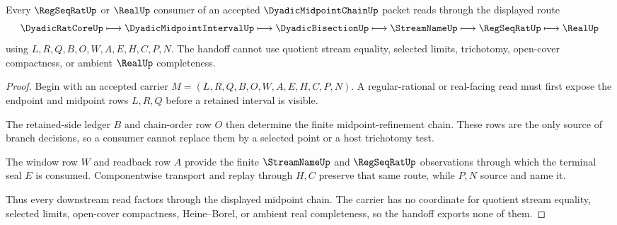 \begin{theorem}
\label{thm:dyadic-midpoint-chain-regseqrat-handoff}
Every $\RegSeqRatUp$ or $\RealUp$ consumer of an accepted $\DyadicMidpointChainUp$ packet reads through the displayed route
$$
\DyadicRatCoreUp \longmapsto \DyadicMidpointIntervalUp \longmapsto \DyadicBisectionUp \longmapsto \StreamNameUp \longmapsto \RegSeqRatUp \longmapsto \RealUp
$$
using $L,R,Q,B,O,W,A,E,H,C,P,N$. The handoff cannot use quotient stream equality, selected limits, trichotomy, open-cover compactness, or ambient $\RealUp$ completeness.
\end{theorem}
\begin{proof}
Begin with an accepted carrier $M=(L,R,Q,B,O,W,A,E,H,C,P,N)$. A regular-rational or real-facing read must first expose the endpoint and midpoint rows $L,R,Q$ before a retained interval is visible.

The retained-side ledger $B$ and chain-order row $O$ then determine the finite midpoint-refinement chain. These rows are the only source of branch decisions, so a consumer cannot replace them by a selected point or a host trichotomy test.

The window row $W$ and readback row $A$ provide the finite $\StreamNameUp$ and $\RegSeqRatUp$ observations through which the terminal seal $E$ is consumed. Componentwise transport and replay through $H,C$ preserve that same route, while $P,N$ source and name it.

Thus every downstream read factors through the displayed midpoint chain. The carrier has no coordinate for quotient stream equality, selected limits, open-cover compactness, Heine--Borel, or ambient real completeness, so the handoff exports none of them.
\end{proof}


\begin{closurestatus}{\DyadicMidpointChainUp}
  \theoryclosure{\seedClosure}
  \formalstatus{\unformalizedV}
\end{closurestatus}
